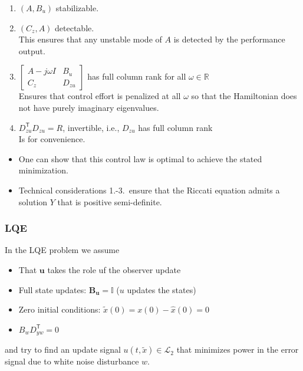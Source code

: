 
\begin{enumerate}
    \item $(A,B_u)$ stabilizable.
    \item $(C_z,A)$ detectable.\\
          This ensures that any unstable mode of $A$ is detected by the performance output.
    \item $\begin{bmatrix} A- j\omega I& B_u\\ C_z& D_{zu}\end{bmatrix}$ has full column rank for all $\omega\in\mathbb{R}$\\
          Ensures that control effort is penalized at all $\omega$ so that the Hamiltonian does not have purely imaginary eigenvalues.
    \item $D_{zu}^{\mathsf{T}}D_{zu}=R$, invertible, i.e., $D_{zu}$ has full column rank\\
          Is for convenience.
\end{enumerate}


\begin{itemize}
    \item One can show that this control law is optimal to achieve the stated minimization.
    \item Technical considerations 1.-3.\ ensure that the Riccati equation admits a solution $Y$ that is positive semi-definite.
\end{itemize}


\subsubsection{LQE}
In the LQE problem we assume
\begin{itemize}
    \item That $\mathbf{u}$ takes the role uf the observer update
    \item Full state updates: $\mathbf{B_u}=\mathbf{\mathbb{I}}$ ($u$ updates the states)
    \item Zero initial conditions: $\tilde{x}(0)=x(0)-\hat{x}(0)=0$
    \item $B_w D_{yw}^{\mathsf{T}}=0$
\end{itemize}
and try to find an update signal $u(t,\tilde{x})\in \mathcal{L}_2$ that minimizes power in the error signal due to white noise disturbance $w$.

